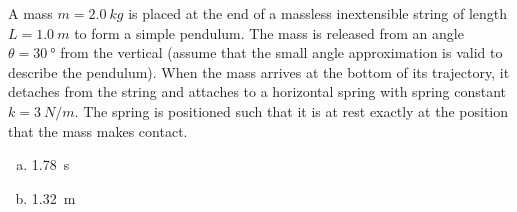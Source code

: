 \question A mass $m=\SI{2.0}{kg}$ is placed at the end of a massless inextensible string of length $L=\SI{1.0}{m}$ to form a simple pendulum. The mass is released from an angle $\theta=\SI{30}{\degree}$ from the vertical (assume that the small angle approximation is valid to describe the pendulum). When the mass arrives at the bottom of its trajectory, it detaches from the string and attaches to a horizontal spring with spring constant $k=\SI{3}{N/m}$. The spring is positioned such that it is at rest exactly at the position that the mass makes contact. 
\begin{finalanswer}
\begin{enumerate}[(a)]
\item \SI{1.78}{s}
\item \SI{1.32}{m}
\end{enumerate}
\end{finalanswer}
